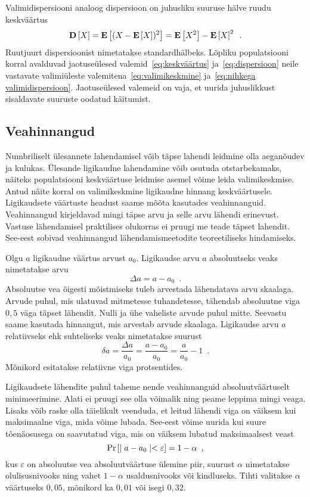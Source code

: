 Valimidispersiooni analoog dispersioon on juhusliku suuruse hälve ruudu keskväärtus
\begin{equation}
    \label{eq:dispersioon}
    \operatorname*{\mathbf{D}}\left[X\right]=\operatorname*{\mathbf{E}}\left[(X - \operatorname*{\mathbf{E}}\left[X\right])^2\right] = \operatorname*{\mathbf{E}}\left[X^2\right] - \operatorname*{\mathbf{E}}\left[X\right]^2 \enspace.
\end{equation}
Ruutjuurt dispersioonist nimetatakse standardhälbeks. Lõpliku populatsiooni korral avalduvad jaotuseülesed valemid~\eqref{eq:keskväärtus} ja~\eqref{eq:dispersioon} neile vastavate valimiüleste valemitena~\eqref{eq:valimikeskmine} ja~\eqref{eq:nihkega valimidispersioon}. Jaotuseülesed valemeid on vaja, et uurida juhuslikkust sisaldavate suuruste oodatud käitumist.

\subsection{Veahinnangud}
\label{section:veahinnangud}
Numbriliselt ülesannete lahendamisel võib täpse lahendi leidmine olla aeganõudev ja kulukas. Ülesande ligikaudne lahendamine võib osutuda otstarbekamaks, näiteks populatsiooni keskväärtuse leidmise asemel võime leida valimikeskmise. Antud näite korral on valimikeskmine ligikaudne hinnang keskväärtusele. Ligikaudsete väärtuste headust saame mõõta kasutades veahinnanguid. Veahinnangud kirjeldavad mingi täpse arvu ja selle arvu lähendi erinevust. Vastuse lähendamisel praktilises olukorras ei pruugi me teade täpset lahendit. See-eest sobivad veahinnangud lähendamismeetodite teoreetiliseks hindamiseks.

Olgu $a$ ligikaudne väärtus arvust $a_0$. Ligikaudse arvu $a$ absoluutseks veaks nimetatakse arvu
\begin{equation*}
    \Delta a = a - a_0 \enspace.
\end{equation*}
Absoluutse vea õigesti mõistmiseks tuleb arvestada lähendatava arvu skaalaga. Arvude puhul, mis ulatuvad mitmetesse tuhandetesse, tähendab absoluutne viga $0{,}5$ väga täpset lähendit. Nulli ja ühe vaheliste arvude puhul mitte. Seevastu saame kasutada hinnangut, mis arvestab arvude skaalaga. Ligikaudse arvu $a$ relatiivseks ehk suhteliseks veaks nimetatakse suurust
\begin{equation*}
    \delta a = \frac{\Delta a}{a_0} = \frac{a - a_0}{a_0} = \frac{a}{a_0} - 1 \enspace.
\end{equation*}
Mõnikord esitatakse relatiivne viga protsentides.

Ligikaudsete lähendite puhul taheme nende veahinnanguid absoluutväärtuselt minimeerimine. Alati ei pruugi see olla võimalik ning peame leppima mingi veaga. Lisaks võib raske olla täielikult veenduda, et leitud lähendi viga on väiksem kui maksimaalne viga, mida võime lubada. See-eest võime uurida kui suure tõenäosusega on saavutatud viga, mis on väiksem lubatud maksimaalsest veast
\begin{equation*}
    \Pr\left[\mid a - a_0 \mid < \varepsilon\right] = 1 - \alpha \enspace,
\end{equation*}
kus $\varepsilon$ on absoluutse vea absoluutväärtuse ülemine piir, suurust $\alpha$ nimetatakse olulisusnivooks ning vahet $1-\alpha$ usaldusnivooks või kindluseks. Tihti valitakse $\alpha$ väärtuseks $0{,}05$, mõnikord ka $0{,}01$ või isegi $0{,}32$.

